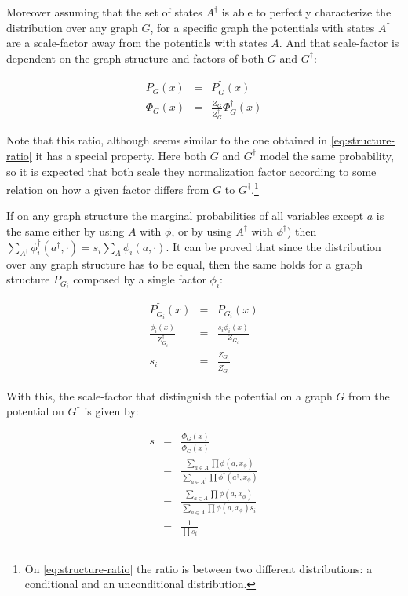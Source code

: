 Moreover assuming that the set of states $A^\dag$ is able to perfectly
characterize the distribution over any graph $G$,
for a specific graph the potentials with states $A^\dag$ are a scale-factor
away from the potentials with states $A$. And that scale-factor is dependent on
the graph structure and factors of both $G$ and $G^\dag$:

\begin{eqnarray}
P_G(x) &=& P^\dag_G(x) \\
\Phi_G(x) &=& \frac{Z_G}{Z^\dag_G} \Phi^\dag_G(x)
\end{eqnarray}

Note that this ratio, although seems similar to the one obtained in
\autoref{eq:structure-ratio} it has a special property. Here both $G$ and
$G^\dag$ model the same probability, so it is expected that both scale they
normalization factor according to some relation on how a given factor differs
from $G$ to $G^\dag$.\footnote{On \autoref{eq:structure-ratio} the ratio is
between two different distributions: a conditional and an unconditional distribution.}

If on any graph structure the marginal probabilities of all variables except $a$
is the same either by using $A$ with $\phi$, or by using $A^\dag$ with $\phi^\dag$)
then $\sum_{A^\dag}\phi^\dag_i(a^\dag, \cdot) = s_i \sum_A \phi_i(a, \cdot)$.
It can be proved that since the distribution over any graph structure has to be
equal, then the same holds for a graph structure $P_{G_i}$ composed by a single
factor $\phi_i$:

\begin{eqnarray*}
P^\dag_{G_i}(x) &=& P_{G_i}(x) \\
\frac{\phi_i(x)}{Z^\dag_{G_i}}  &=& \frac{s_i \phi_i(x)}{Z_{G_i}} \\
s_i &=& \frac{Z_{G_i}}{Z^\dag_{G_i}}
\end{eqnarray*}

With this, the scale-factor that distinguish the potential on a graph
$G$ from the potential on $G^\dag$ is given by:

\begin{eqnarray}
s &=& \frac{\Phi_G(x)}{\Phi^\dag_G(x)} \\
  &=& \frac{\sum_{a \in A}\prod \phi(a, x_\phi)}
           {\sum_{a \in A^\dag}\prod \phi^\dag(a^\dag, x_\phi)} \\
  &=& \frac{\sum_{a \in A}\prod \phi(a, x_\phi)}
           {\sum_{a \in A}\prod \phi(a, x_\phi) s_i} \\
  &=& \frac{1}{\prod s_i}
\end{eqnarray}



